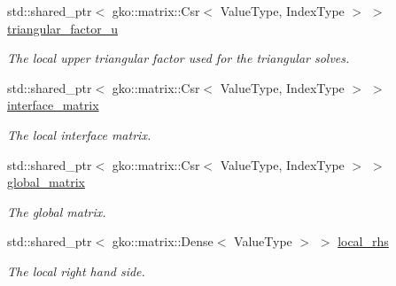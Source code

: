 \begin{DoxyCompactItemize}
\mbox{\label{classSchwarzWrappers_1_1SchwarzBase_a5b49b97dad7999705c0dcb2768b864b1}} 
std\+::shared\+\_\+ptr$<$ gko\+::matrix\+::\+Csr$<$ Value\+Type, Index\+Type $>$ $>$ \hyperlink{classSchwarzWrappers_1_1SchwarzBase_a5b49b97dad7999705c0dcb2768b864b1}{triangular\+\_\+factor\+\_\+u}
\begin{DoxyCompactList}\small\item\em The local upper triangular factor used for the triangular solves. \end{DoxyCompactList}\item 
\mbox{\label{classSchwarzWrappers_1_1SchwarzBase_aea6575d93a87dec1f97ef2f40ff87199}} 
std\+::shared\+\_\+ptr$<$ gko\+::matrix\+::\+Csr$<$ Value\+Type, Index\+Type $>$ $>$ \hyperlink{classSchwarzWrappers_1_1SchwarzBase_aea6575d93a87dec1f97ef2f40ff87199}{interface\+\_\+matrix}
\begin{DoxyCompactList}\small\item\em The local interface matrix. \end{DoxyCompactList}\item 
\mbox{\label{classSchwarzWrappers_1_1SchwarzBase_a7dc6207713163fb9298ff2667da9a11f}} 
std\+::shared\+\_\+ptr$<$ gko\+::matrix\+::\+Csr$<$ Value\+Type, Index\+Type $>$ $>$ \hyperlink{classSchwarzWrappers_1_1SchwarzBase_a7dc6207713163fb9298ff2667da9a11f}{global\+\_\+matrix}
\begin{DoxyCompactList}\small\item\em The global matrix. \end{DoxyCompactList}\item 
\mbox{\label{classSchwarzWrappers_1_1SchwarzBase_a7b77d55b8b5fc2c301036c2c621b002e}} 
std\+::shared\+\_\+ptr$<$ gko\+::matrix\+::\+Dense$<$ Value\+Type $>$ $>$ \hyperlink{classSchwarzWrappers_1_1SchwarzBase_a7b77d55b8b5fc2c301036c2c621b002e}{local\+\_\+rhs}
\begin{DoxyCompactList}\small\item\em The local right hand side. \end{DoxyCompactList}\item 
\mbox{\label{classSchwarzWrappers_1_1SchwarzBase_aa44d6d84a22c165ac30a61e47a126465}} 

\end{DoxyCompactItemize}
